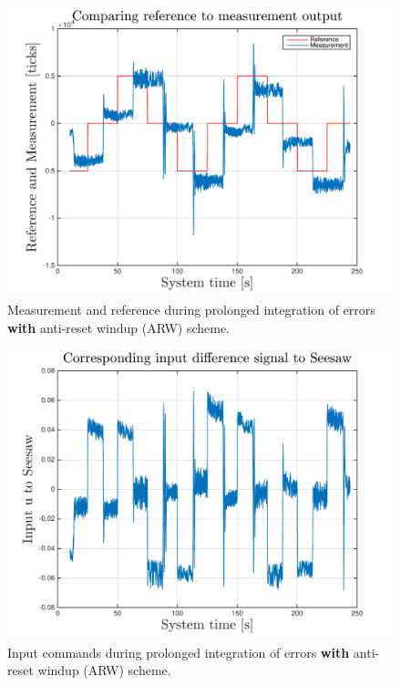 \documentclass[12pt,a4paper,twocolumn]{article}
\begin{document}
\begin{figure}[ht]
\centering
\includegraphics[width=.95\linewidth]{figures/seesaw_measurement_task3_ARW_fig1}
\caption[Measure1]{\label{f:measure1} Measurement and reference during prolonged integration of errors \textbf{with} anti-reset windup (ARW) scheme.}
\label{fig:seesaw_measurement_task3_ARW_fig1}
\end{figure}

\begin{figure}[ht]
\centering
\includegraphics[width=.95\linewidth]{figures/seesaw_measurement_task3_ARW_fig2}
\caption[Measure1]{\label{f:measure1} Input commands during prolonged integration of errors \textbf{with} anti-reset windup (ARW) scheme.}
\label{fig:seesaw_measurement_task3_ARW_fig2}
\end{figure}
\end{document}
